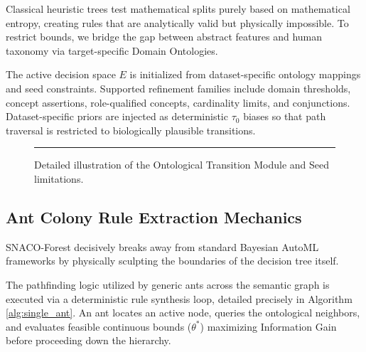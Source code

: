 \documentclass[preprint,12pt,authoryear]{elsarticle}
\begin{document}
Classical heuristic trees test mathematical splits purely based on mathematical entropy, creating rules that are analytically valid but physically impossible. To restrict bounds, we bridge the gap between abstract features and human taxonomy via target-specific Domain Ontologies.

The active decision space $E$ is initialized from dataset-specific ontology mappings and seed constraints. Supported refinement families include domain thresholds, concept assertions, role-qualified concepts, cardinality limits, and conjunctions. Dataset-specific priors are injected as deterministic $\tau_0$ biases so that path traversal is restricted to biologically plausible transitions.

\begin{figure}[htpb!]
    \centering
    \rule{10cm}{5cm} %
    \vspace{0.2cm}
    \caption{Detailed illustration of the Ontological Transition Module and Seed limitations.}
    \label{fig:aco_module}
\end{figure}

\subsection{Ant Colony Rule Extraction Mechanics}
\label{subsec:aco_math}

SNACO-Forest decisively breaks away from standard Bayesian AutoML frameworks by physically sculpting the boundaries of the decision tree itself. 

The pathfinding logic utilized by generic ants across the semantic graph is executed via a deterministic rule synthesis loop, detailed precisely in Algorithm \ref{alg:single_ant}. An ant locates an active node, queries the ontological neighbors, and evaluates feasible continuous bounds ($\theta^*$) maximizing Information Gain before proceeding down the hierarchy.
\end{document}
